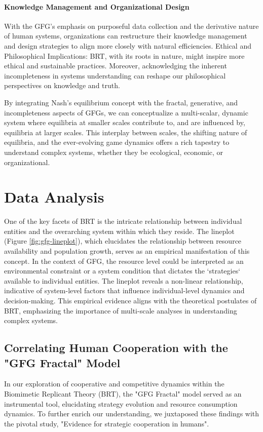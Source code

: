 \documentclass[sn-nature]{sn-jnl}%
\theoremstyle{thmstyleone}%
\theoremstyle{thmstyletwo}%
\theoremstyle{thmstylethree}%
\begin{document}
\paragraph{Knowledge Management and Organizational Design}
With the GFG's emphasis on purposeful data collection and the derivative nature of human systems, organizations can restructure their knowledge management and design strategies to align more closely with natural efficiencies\cite{neveu_dealing_2019}.
Ethical and Philosophical Implications:
BRT, with its roots in nature, might inspire more ethical and sustainable practices. Moreover, acknowledging the inherent incompleteness in systems understanding can reshape our philosophical perspectives on knowledge and truth.



By integrating Nash's equilibrium concept with the fractal, generative, and incompleteness aspects of GFGs, we can conceptualize a multi-scalar, dynamic system where equilibria at smaller scales contribute to, and are influenced by, equilibria at larger scales. This interplay between scales, the shifting nature of equilibria, and the ever-evolving game dynamics offers a rich tapestry to understand complex systems, whether they be ecological, economic, or organizational.

\section{Data Analysis}\label{sec5}

One of the key facets of BRT is the intricate relationship between individual entities and the overarching system within which they reside. The lineplot (Figure \ref{fig:gfg-lineplot}), which elucidates the relationship between resource availability and population growth, serves as an empirical manifestation of this concept\cite{whiteside_data_2019}. In the context of GFG, the resource level could be interpreted as an environmental constraint or a system condition that dictates the `strategies` available to individual entities. The lineplot reveals a non-linear relationship, indicative of system-level factors that influence individual-level dynamics and decision-making. This empirical evidence aligns with the theoretical postulates of BRT, emphasizing the importance of multi-scale analyses in understanding complex systems.

\subsection{Correlating Human Cooperation with the "GFG Fractal" Model}
In our exploration of cooperative and competitive dynamics within the Biomimetic Replicant Theory (BRT), the "GFG Fractal" model served as an instrumental tool, elucidating strategy evolution and resource consumption dynamics. To further enrich our understanding, we juxtaposed these findings with the pivotal study, "Evidence for strategic cooperation in humans".
\end{document}
